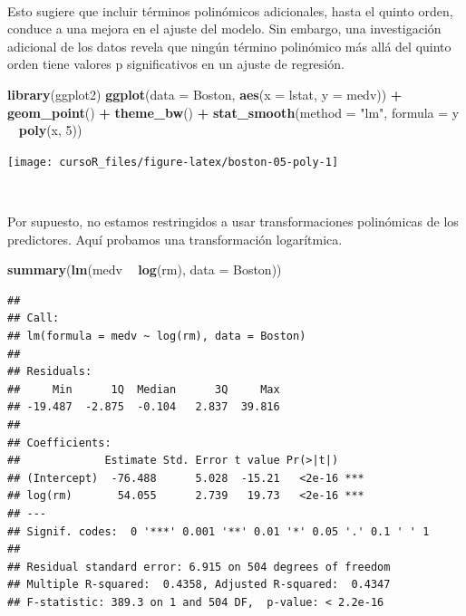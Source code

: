 \documentclass[]{book}
\newenvironment{Shaded}{\begin{snugshade}}{\end{snugshade}}
\newcommand{\KeywordTok}[1]{\textcolor[rgb]{0.13,0.29,0.53}{\textbf{#1}}}
\newcommand{\DataTypeTok}[1]{\textcolor[rgb]{0.13,0.29,0.53}{#1}}
\newcommand{\DecValTok}[1]{\textcolor[rgb]{0.00,0.00,0.81}{#1}}
\newcommand{\StringTok}[1]{\textcolor[rgb]{0.31,0.60,0.02}{#1}}
\newcommand{\OperatorTok}[1]{\textcolor[rgb]{0.81,0.36,0.00}{\textbf{#1}}}
\newcommand{\NormalTok}[1]{#1}
\begin{document}
~

Esto sugiere que incluir términos polinómicos adicionales, hasta el
quinto orden, conduce a una mejora en el ajuste del modelo. Sin embargo,
una investigación adicional de los datos revela que ningún término
polinómico más allá del quinto orden tiene valores p significativos en
un ajuste de regresión.

\begin{Shaded}
\begin{Highlighting}[]
\KeywordTok{library}\NormalTok{(ggplot2)}
\KeywordTok{ggplot}\NormalTok{(}\DataTypeTok{data =}\NormalTok{ Boston, }\KeywordTok{aes}\NormalTok{(}\DataTypeTok{x =}\NormalTok{ lstat, }\DataTypeTok{y =}\NormalTok{ medv)) }\OperatorTok{+}\StringTok{ }
\StringTok{  }\KeywordTok{geom_point}\NormalTok{() }\OperatorTok{+}\StringTok{ }
\StringTok{  }\KeywordTok{theme_bw}\NormalTok{() }\OperatorTok{+}\StringTok{ }
\StringTok{  }\KeywordTok{stat_smooth}\NormalTok{(}\DataTypeTok{method =} \StringTok{"lm"}\NormalTok{, }\DataTypeTok{formula =}\NormalTok{ y }\OperatorTok{~}\StringTok{ }\KeywordTok{poly}\NormalTok{(x, }\DecValTok{5}\NormalTok{))}
\end{Highlighting}
\end{Shaded}

\begin{center}\texttt{[image: cursoR\_files/figure-latex/boston-05-poly-1]} \end{center}

~

Por supuesto, no estamos restringidos a usar transformaciones
polinómicas de los predictores. Aquí probamos una transformación
logarítmica.

\begin{Shaded}
\begin{Highlighting}[]
\KeywordTok{summary}\NormalTok{(}\KeywordTok{lm}\NormalTok{(medv }\OperatorTok{~}\StringTok{ }\KeywordTok{log}\NormalTok{(rm), }\DataTypeTok{data =}\NormalTok{ Boston))}
\end{Highlighting}
\end{Shaded}

\begin{verbatim}
## 
## Call:
## lm(formula = medv ~ log(rm), data = Boston)
## 
## Residuals:
##     Min      1Q  Median      3Q     Max 
## -19.487  -2.875  -0.104   2.837  39.816 
## 
## Coefficients:
##             Estimate Std. Error t value Pr(>|t|)    
## (Intercept)  -76.488      5.028  -15.21   <2e-16 ***
## log(rm)       54.055      2.739   19.73   <2e-16 ***
## ---
## Signif. codes:  0 '***' 0.001 '**' 0.01 '*' 0.05 '.' 0.1 ' ' 1
## 
## Residual standard error: 6.915 on 504 degrees of freedom
## Multiple R-squared:  0.4358, Adjusted R-squared:  0.4347 
## F-statistic: 389.3 on 1 and 504 DF,  p-value: < 2.2e-16
\end{verbatim}
\end{document}
